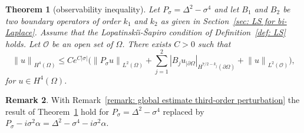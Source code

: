 \documentclass[JEP,XML,SOM,Unicode,published]{cedram}
\theoremstyle{plain}
\newtheorem{theorem}{Theorem}[section]
\theoremstyle{definition}
\newtheorem{remark}[theorem]{Remark}
\newcommand{\LS}{Lopatinski\u{\i}-\v{S}apiro\xspace}
\newcommand{\scrO}{\mathscr O}
\newcommand{\bd}{\ensuremath{_{|\partial\Omega}}}
\newcommand{\Norm}[2]{{\| #1 \|}_{#2}}
\newcommand{\norm}[2]{{|#1|}_{#2}}
\newcommand{\Psig}{P_{\sigma}}
\begin{document}
\begin{theorem}[observability inequality]
\label{th: observation}
Let $\Psig = \Delta^2 - \sigma^4$ and
let $B_1$ and $B_2$ be two boundary operators of order $k_1$ and
$k_2$ as given in Section~\ref{sec: LS for bi-Laplace}.
Assume that the \LS condition of Definition~\ref{def: LS} holds.
Let $\scrO$ be an open set of $\Omega$. There exists $C>0$ such that
\begin{equation*}
\Norm{u}{H^4(\Omega)} \leq C
e^{C|\sigma|} \big(\Norm{\Psig u}{L^2(\Omega)}
+ \sum_{j=1}^{2} \norm{B_j u\bd}{H^{7/2-k_j}(\partial\Omega)}
+ \Norm{u}{L^2(\scrO)}
\big),
\end{equation*}
for $u \in H^4(\Omega)$.
\end{theorem}

\begin{remark}
\label{remark: observability third-order perturbation}
With Remark~\ref{remark: global estimate third-order perturbation} the
result of Theorem~\ref{th: observation} hold for $\Psig= \Delta^2 -\sigma^4$ replaced by $\Psig-i \sigma^2 \alpha = \Delta^2 -\sigma^4 -i \sigma^2 \alpha $.
\end{remark}
\end{document}
